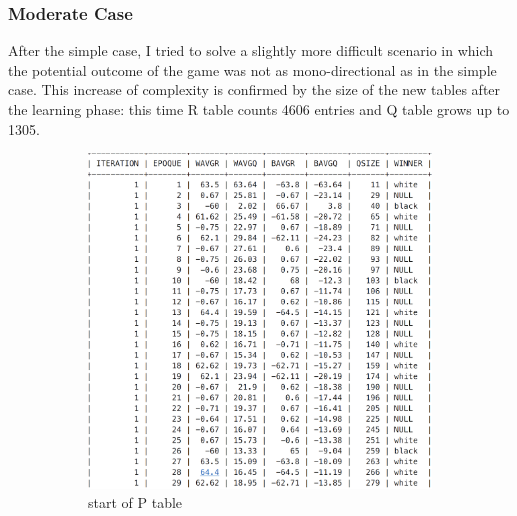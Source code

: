 \documentclass{article}
\begin{document}
\newpage


				\subsubsection{Moderate Case}
				After the simple case, I tried to solve a slightly more difficult scenario in which the potential outcome of the game was not as mono-directional as in the simple case. This increase of complexity is confirmed by the size of the new tables after the learning phase: this time R table counts 4606 entries and Q table grows up to 1305.
				

\begin{figure}[h!]
		\centering
        \begin{subfigure}{0.50\textwidth}
                \includegraphics[width=\linewidth]{moderate_ptable_ini}
                \caption{start of P table}
        \end{subfigure}\qquad
        \begin{subfigure}{0.50\textwidth}

\end{subfigure}
\end{figure}
\end{document}
